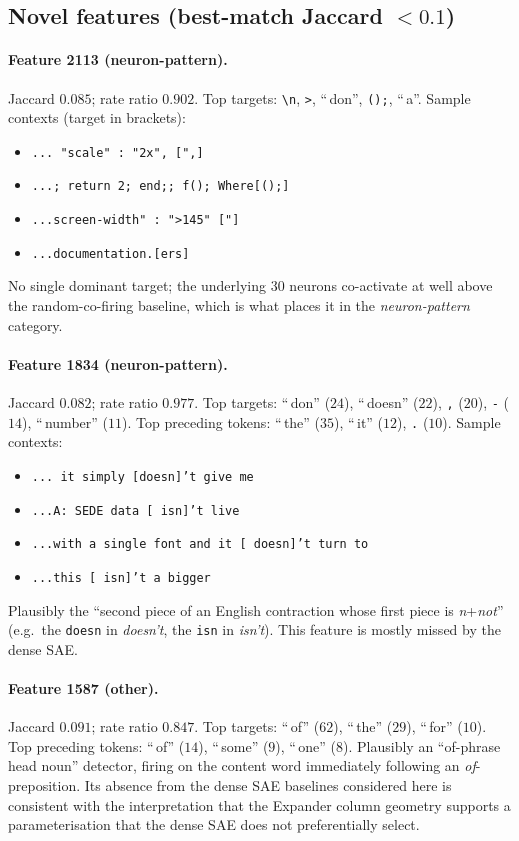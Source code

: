 \documentclass{article}
\theoremstyle{plain}
\theoremstyle{definition}
\theoremstyle{remark}
\begin{document}
\subsection*{Novel features (best-match Jaccard $<0.1$)}

\paragraph{Feature 2113 (neuron-pattern).}
Jaccard $0.085$; rate ratio $0.902$.
%
Top targets: \texttt{\textbackslash n}, \texttt{>}, ``\,don'', \texttt{();}, ``\,a''.
%
Sample contexts (target in brackets):
\begin{itemize}
    \item \texttt{...\ "scale" : "2x", [",]}
    \item \texttt{...; return 2; end;; f(); Where[();]}
    \item \texttt{...screen-width" : ">145" ["]}
    \item \texttt{...documentation.[ers]}
\end{itemize}
No single dominant target; the underlying $30$ neurons co-activate at well above the random-co-firing baseline, which is what places it in the \emph{neuron-pattern} category.

\paragraph{Feature 1834 (neuron-pattern).}
Jaccard $0.082$; rate ratio $0.977$.
%
Top targets: ``\,don'' ($24$), ``\,doesn'' ($22$), \texttt{,} ($20$), \texttt{-} ($14$), ``\,number'' ($11$).
%
Top preceding tokens: ``\,the'' ($35$), ``\,it'' ($12$), \texttt{.} ($10$).
%
Sample contexts:
\begin{itemize}
    \item \texttt{...\ it simply [doesn]'t give me}
    \item \texttt{...A: SEDE data [ isn]'t live}
    \item \texttt{...with a single font and it [ doesn]'t turn to}
    \item \texttt{...this [ isn]'t a bigger}
\end{itemize}
Plausibly the ``second piece of an English contraction whose first piece is \emph{n}+\emph{not}'' (e.g.\ the \texttt{doesn} in \emph{doesn't}, the \texttt{isn} in \emph{isn't}).
%
This feature is mostly missed by the dense SAE.

\paragraph{Feature 1587 (other).}
Jaccard $0.091$; rate ratio $0.847$.
%
Top targets: ``\,of'' ($62$), ``\,the'' ($29$), ``\,for'' ($10$).
%
Top preceding tokens: ``\,of'' ($14$), ``\,some'' ($9$), ``\,one'' ($8$).
%
Plausibly an ``of-phrase head noun'' detector, firing on the content word immediately following an \emph{of}-preposition.
%
Its absence from the dense SAE baselines considered here is consistent with the interpretation that the Expander column geometry supports a parameterisation that the dense SAE does not preferentially select.
\end{document}
